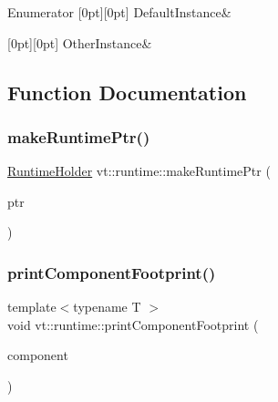 \begin{DoxyEnumFields}{Enumerator}
[0pt][0pt]{}\mbox{\label{namespacevt_1_1runtime_afca910c1b38b3975f7c1da8001a77d58af4b803eff3cdc140ed473828f9c89101}} 
Default\+Instance&\\
\hline

[0pt][0pt]{}\mbox{\label{namespacevt_1_1runtime_afca910c1b38b3975f7c1da8001a77d58af541bede5bc84a16357c26d30a508ff4}} 
Other\+Instance&\\
\hline

\end{DoxyEnumFields}


\subsection{Function Documentation}
\mbox{\label{namespacevt_1_1runtime_a71998fecf2a4d70b11e3ae4aa47810db}} 
\subsubsection{\texorpdfstring{make\+Runtime\+Ptr()}{makeRuntimePtr()}}
{\footnotesize\ttfamily \hyperlink{structvt_1_1runtime_1_1_runtime_holder}{Runtime\+Holder} vt\+::runtime\+::make\+Runtime\+Ptr (\begin{DoxyParamCaption}\item[{\hyperlink{structvt_1_1runtime_1_1_runtime_holder_a9740e8aa7487fcf38b67a7e160d7b046}{Runtime\+Holder\+::\+Pointer\+Type} const}]{ptr }\end{DoxyParamCaption})\hspace{0.3cm}{\ttfamily [inline]}}

\mbox{\label{namespacevt_1_1runtime_aaaded5fb88c918140e08be1b0c1fd488}} 
\subsubsection{\texorpdfstring{print\+Component\+Footprint()}{printComponentFootprint()}}
{\footnotesize\ttfamily template$<$typename T $>$ \\
void vt\+::runtime\+::print\+Component\+Footprint (\begin{DoxyParamCaption}\item[{T $\ast$}]{component }\end{DoxyParamCaption})}

